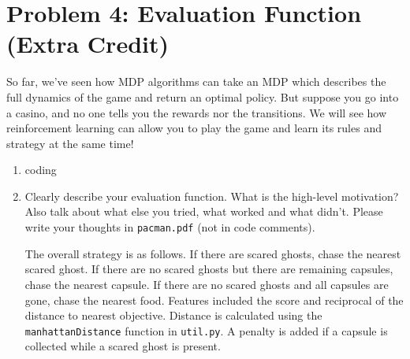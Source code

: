 \documentclass[10pt]{article}
\begin{document}
\section*{\normalsize Problem 4: Evaluation Function (Extra Credit)}

So far, we've seen how MDP algorithms can take an MDP which describes the full dynamics of the game and return an optimal policy. But suppose you go into a casino, and no one tells you the rewards nor the transitions. We will see how reinforcement learning can allow you to play the game and learn its rules and strategy at the same time!

\begin{enumerate}[label=(\alph*)]

  \item coding
  
  \item Clearly describe your evaluation function. What is the high-level motivation? Also talk about what else you tried, what worked and what didn't. Please write your thoughts in \texttt{pacman.pdf} (not in code comments).
  
  The overall strategy is as follows. If there are scared ghosts, chase the nearest scared ghost. If there are no scared ghosts but there are remaining capsules, chase the nearest capsule. If there are no scared ghosts and all capsules are gone, chase the nearest food. Features included the score and reciprocal of the distance to nearest objective. Distance is calculated using the \texttt{manhattanDistance} function in \texttt{util.py}. A penalty is added if a capsule is collected while a scared ghost is present.
		
\end{enumerate}
\end{document}
